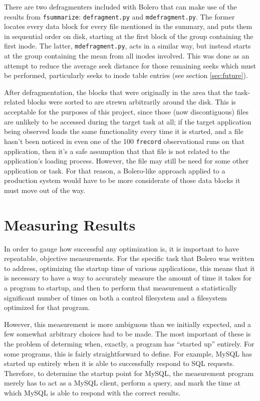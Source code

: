 \documentclass[10pt,twocolumn,letterpaper]{article}
\begin{document}
There are two defragmenters included with Bolero that can make use of the results from \texttt{fsummarize}:
\texttt{defragment.py} and \texttt{mdefragment.py}. The former locates every data block for every file mentioned
in the summary, and puts them in sequential order on disk, starting at the first block of the group containing
the first inode. The latter, \texttt{mdefragment.py}, acts in a similar way, but instead starts at the group containing the mean from all inodes involved. This was done as an attempt to reduce the average seek distance for
those remaining seeks which must be performed, particularly seeks to inode table entries (see section \ref{sec:future}).

After defragmentation, the blocks that were originally in the area that the task-related blocks were sorted to
are strewn arbitrarily around the disk. This is acceptable for the purposes of this project, since those (now
discontiguous) files are unlikely to be accessed during the target task at all; if the target application being observed loads the same functionality every time it is started, and a file hasn't been noticed
in even one of the 100 \texttt{frecord} observational runs on that application, then it's a safe assumption that that file is not related to the application's loading process. However, the file may still be need for some other application or task. For that reason, a Bolero-like approach applied to a production system would have to be more considerate of those data blocks it must move out of the way.

\section{Measuring Results}\label{sec:results}

In order to gauge how successful any optimization is, it is important to have
repeatable, objective measurements. For the specific task that Bolero was written
to address, optimizing the startup time of various applications, this means that it
is necessary to have a way to accurately measure the amount of time it takes for
a program to startup, and then to perform that measurement a statistically significant
number of times on both a control filesystem and a filesystem optimized for that program.

However, this measurement is more ambiguous than we initially expected, and a few
somewhat arbitrary choices had to be made. The most important of these is the problem of determing when, exactly,
a program has ``started up'' entirely. For some programs, this is fairly straightforward to define. For example,
MySQL has started up entirely when it is able to successfully respond to SQL requests. Therefore,
to determine the startup point for MySQL, the measurement program merely has to act
as a MySQL client, perform a query, and mark the time at which MySQL is able to
respond with the correct results.
\end{document}
